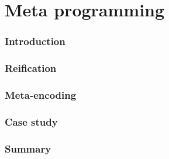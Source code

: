 \part{Meta programming}
\section{Introduction}

\section{Reification}

\section{Meta-encoding}

\section{Case study} %
% 
% 
% 
% 

% 
% 
\section{Summary}

%
